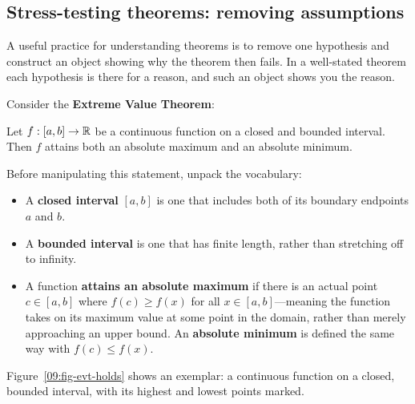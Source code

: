 \subsection{Stress-testing theorems: removing assumptions}

A useful practice for understanding theorems is to remove one hypothesis and construct an object showing why the theorem then fails. In a well-stated theorem each hypothesis is there for a reason, and such an object shows you the reason.

Consider the \textbf{Extreme Value Theorem}:
\begin{theorem}
Let $f : [a, b] \to \mathbb{R}$ be a continuous function on a closed and bounded interval. Then $f$ attains both an absolute maximum and an absolute minimum.
\end{theorem}

Before manipulating this statement, unpack the vocabulary:
\begin{itemize}
\item A \textbf{closed interval} $[a, b]$ is one that includes both of its boundary endpoints $a$ and $b$.
\item A \textbf{bounded interval} is one that has finite length, rather than stretching off to infinity.
\item A function \textbf{attains an absolute maximum} if there is an actual point $c \in [a, b]$ where $f(c) \ge f(x)$ for all $x \in [a, b]$---meaning the function takes on its maximum value at some point in the domain, rather than merely approaching an upper bound. An \textbf{absolute minimum} is defined the same way with $f(c) \le f(x)$.
\end{itemize}

Figure~\ref{09:fig-evt-holds} shows an exemplar: a continuous function on a closed, bounded interval, with its highest and lowest points marked.

